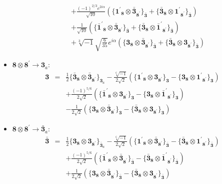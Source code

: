 \documentclass[english]{article}
\newcommand{\subcg}[3]{\big\{ {#1}\otimes{#2}\big\}^{}_{#3}}
\newcommand{\rep}[1]{\mathbf{#1}}
\begin{document}
\begin{itemize}
\begin{eqnarray*}
 & & +\frac{(-1)^{2/3} e^{2 i \alpha }}{\sqrt{10}}\left(\subcg{\rep{1^{\prime}}_{\rep{8}}}{\rep{\bar{3}}_{\rep{8^{\prime}}}}{\rep{\bar{3}}}+\subcg{\rep{\bar{3}}_{\rep{8}}}{\rep{1^{\prime}}_{\rep{8^{\prime}}}}{\rep{\bar{3}}}\right) \\ 
 & & +\frac{1}{\sqrt{10}}\left(\subcg{\rep{\bar{1}^{\prime}}_{\rep{8}}}{\rep{\bar{3}}_{\rep{8^{\prime}}}}{\rep{\bar{3}}}+\subcg{\rep{\bar{3}}_{\rep{8}}}{\rep{\bar{1}^{\prime}}_{\rep{8^{\prime}}}}{\rep{\bar{3}}}\right) \\ 
 & & +\sqrt[3]{-1} \sqrt{\frac{6}{35}} e^{i \alpha }\left(\subcg{\rep{3}_{\rep{8}}}{\rep{\bar{3}}_{\rep{8^{\prime}}}}{\rep{\bar{3}}}+\subcg{\rep{\bar{3}}_{\rep{8}}}{\rep{3}_{\rep{8^{\prime}}}}{\rep{\bar{3}}}\right)
\end{eqnarray*}
\item $\rep{8}\otimes\rep{8^{\prime}}\to\rep{3}_{a}$:
\begin{eqnarray*}
\rep{3} &=& \frac{1}{2}\subcg{\rep{\bar{3}}_{\rep{8}}}{\rep{\bar{3}}_{\rep{8^{\prime}}}}{\rep{3}_{a}}-\frac{\sqrt[6]{-1}}{2 \sqrt{2}}\left(\subcg{\rep{1^{\prime}}_{\rep{8}}}{\rep{3}_{\rep{8^{\prime}}}}{\rep{3}}-\subcg{\rep{3}_{\rep{8}}}{\rep{1^{\prime}}_{\rep{8^{\prime}}}}{\rep{3}}\right) \\ 
 & & +\frac{(-1)^{5/6}}{2 \sqrt{2}}\left(\subcg{\rep{\bar{1}^{\prime}}_{\rep{8}}}{\rep{3}_{\rep{8^{\prime}}}}{\rep{3}}-\subcg{\rep{3}_{\rep{8}}}{\rep{\bar{1}^{\prime}}_{\rep{8^{\prime}}}}{\rep{3}}\right) \\ 
 & & -\frac{1}{2 \sqrt{2}}\left(\subcg{\rep{3}_{\rep{8}}}{\rep{\bar{3}}_{\rep{8^{\prime}}}}{\rep{3}}-\subcg{\rep{\bar{3}}_{\rep{8}}}{\rep{3}_{\rep{8^{\prime}}}}{\rep{3}}\right)
\end{eqnarray*}
\item $\rep{8}\otimes\rep{8^{\prime}}\to\rep{\bar{3}}_{a}$:
\begin{eqnarray*}
\rep{\bar{3}} &=& \frac{1}{2}\subcg{\rep{3}_{\rep{8}}}{\rep{3}_{\rep{8^{\prime}}}}{\rep{\bar{3}}_{a}}-\frac{\sqrt[6]{-1}}{2 \sqrt{2}}\left(\subcg{\rep{1^{\prime}}_{\rep{8}}}{\rep{\bar{3}}_{\rep{8^{\prime}}}}{\rep{\bar{3}}}-\subcg{\rep{\bar{3}}_{\rep{8}}}{\rep{1^{\prime}}_{\rep{8^{\prime}}}}{\rep{\bar{3}}}\right) \\ 
 & & +\frac{(-1)^{5/6}}{2 \sqrt{2}}\left(\subcg{\rep{\bar{1}^{\prime}}_{\rep{8}}}{\rep{\bar{3}}_{\rep{8^{\prime}}}}{\rep{\bar{3}}}-\subcg{\rep{\bar{3}}_{\rep{8}}}{\rep{\bar{1}^{\prime}}_{\rep{8^{\prime}}}}{\rep{\bar{3}}}\right) \\ 
 & & +\frac{1}{2 \sqrt{2}}\left(\subcg{\rep{3}_{\rep{8}}}{\rep{\bar{3}}_{\rep{8^{\prime}}}}{\rep{\bar{3}}}-\subcg{\rep{\bar{3}}_{\rep{8}}}{\rep{3}_{\rep{8^{\prime}}}}{\rep{\bar{3}}}\right)

\end{eqnarray*}
\end{itemize}
\end{document}
